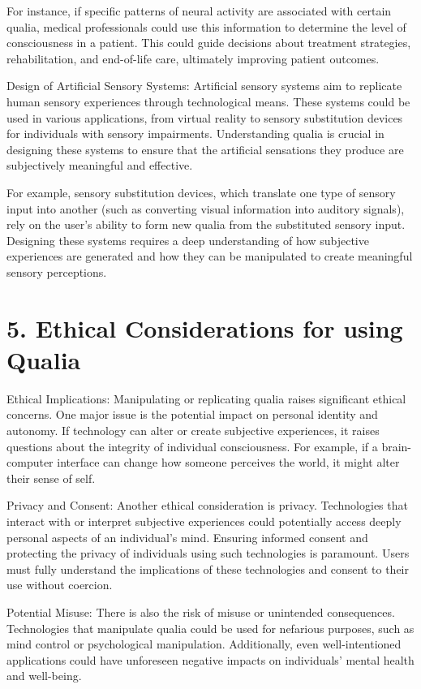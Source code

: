 \documentclass{article}
\begin{document}
For instance, if specific patterns of neural activity are associated with certain qualia, medical professionals could use this information to determine the level of consciousness in a patient. This could guide decisions about treatment strategies, rehabilitation, and end-of-life care, ultimately improving patient outcomes.

Design of Artificial Sensory Systems:
Artificial sensory systems aim to replicate human sensory experiences through technological means. These systems could be used in various applications, from virtual reality to sensory substitution devices for individuals with sensory impairments. Understanding qualia is crucial in designing these systems to ensure that the artificial sensations they produce are subjectively meaningful and effective.

For example, sensory substitution devices, which translate one type of sensory input into another (such as converting visual information into auditory signals), rely on the user's ability to form new qualia from the substituted sensory input. Designing these systems requires a deep understanding of how subjective experiences are generated and how they can be manipulated to create meaningful sensory perceptions.

\section*{5. Ethical Considerations for using Qualia}

Ethical Implications:
Manipulating or replicating qualia raises significant ethical concerns. One major issue is the potential impact on personal identity and autonomy. If technology can alter or create subjective experiences, it raises questions about the integrity of individual consciousness. For example, if a brain-computer interface can change how someone perceives the world, it might alter their sense of self.

Privacy and Consent:
Another ethical consideration is privacy. Technologies that interact with or interpret subjective experiences could potentially access deeply personal aspects of an individual's mind. Ensuring informed consent and protecting the privacy of individuals using such technologies is paramount. Users must fully understand the implications of these technologies and consent to their use without coercion.

Potential Misuse:
There is also the risk of misuse or unintended consequences. Technologies that manipulate qualia could be used for nefarious purposes, such as mind control or psychological manipulation. Additionally, even well-intentioned applications could have unforeseen negative impacts on individuals' mental health and well-being.
\end{document}
